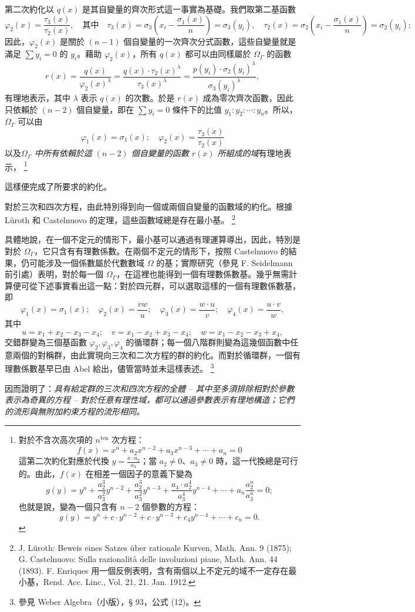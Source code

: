 \documentclass[11pt]{article}
\providecommand{\srcfn}[2]{%
  \begingroup
  \renewcommand{\thefootnote}{#1}%
  \footnote{#2}%
  \addtocounter{footnote}{-1}%
  \endgroup}
\begin{document}
第二次約化以 $q(x)$ 是其自變量的齊次形式這一事實為基礎。我們取第二基函數
\[
\varphi_2(x)=\frac{\tau_3(x)}{\tau_2(x)},\quad \text{其中}\quad
\tau_3(x)=\sigma_3\left(x_i-\frac{\sigma_1(x)}{n}\right)=\sigma_3(y_i),\quad
\tau_2(x)=\sigma_2\left(x_i-\frac{\sigma_1(x)}{n}\right)=\sigma_2(y_i);
\]
因此，$\varphi_2(x)$ 是關於 $(n-1)$ 個自變量的一次齊次分式函數，這些自變量就是滿足 $\sum y_i=0$ 的 $y_i$。藉助 $\varphi_2(x)$，所有 $q(x)$ 都可以由同樣屬於 $\Omega_\Gamma$ 的函數
\[
r(x)=\frac{q(x)}{\varphi_2(x)^\lambda}=\frac{q(x)\cdot\tau_2(x)^\lambda}{\tau_3(x)^\lambda}=\frac{p(y_i)\cdot\sigma_2(y_i)^\lambda}{\sigma_3(y_i)^\lambda},
\]
有理地表示，其中 $\lambda$ 表示 $q(x)$ 的次數。於是 $r(x)$ 成為零次齊次函數，因此只依賴於 $(n-2)$ 個自變量，即在 $\sum y_i=0$ 條件下的比值 $y_1:y_2:\cdots:y_n$。所以，$\Omega_\Gamma$ 可以由
\[
\varphi_1(x)=\sigma_1(x);\quad \varphi_2(x)=\frac{\tau_3(x)}{\tau_2(x)}
\]
以及\emph{$\Omega_\Gamma$ 中所有依賴於這 $(n-2)$ 個自變量的函數 $r(x)$ 所組成的域}有理地表示，\srcfn{*)}{對於不含次高次項的 $n^{\text{ten}}$ 次方程：
\[
f(x)=x^n+a_2x^{n-2}+a_3x^{n-3}+\cdots+a_n=0
\]
這第二次約化對應於代換 $y=\frac{x\cdot a_2}{a_3}$；當 $a_2\neq0$、$a_3\neq0$ 時，這一代換總是可行的。由此，$f(x)$ 在相差一個因子的意義下變為
\[
g(y)=y^n+\frac{a_2^3}{a_3^2}y^{n-2}+\frac{a_2^3}{a_3^2}y^{n-3}+\frac{a_4\cdot a_2^4}{a_3^4}y^{n-4}+\cdots+a_n\frac{a_2^n}{a_3^n}=0;
\]
也就是說，變為一個只含有 $n-2$ 個參數的方程：
\[
g(y)=y^n+c\cdot y^{n-2}+c\cdot y^{n-3}+c_4y^{n-4}+\cdots+c_n=0.
\]} 這樣便完成了所要求的約化。

對於三次和四次方程，由此特別得到向一個或兩個自變量的函數域的約化。根據 Lüroth 和 Castelnuovo 的定理，這些函數域總是存在最小基。\srcfn{**)}{J. Lüroth: Beweis eines Satzes über rationale Kurven, Math. Ann. 9 (1875); G. Castelnuovo: Sulla razionalità delle involuzioni piane, Math. Ann. 44 (1893). F. Enriques 用一個反例表明，含有兩個以上不定元的域不一定存在最小基，Rend. Acc. Linc., Vol. 21, 21. Jan. 1912.} 具體地說，在一個不定元的情形下，最小基可以通過有理運算導出，因此，特別是對於 $\Omega_\Gamma$，它只含有有理數係數。在兩個不定元的情形下，按照 Castelnuovo 的結果，仍可能涉及一個係數屬於代數數域 $\Omega$ 的基；實際研究（參見 F. Seidelmann 前引處）表明，對於每一個 $\Omega_\Gamma$，在這裡也能得到一個有理數係數基。幾乎無需計算便可從下述事實看出這一點：對於四元群，可以選取這樣的一個有理數係數基，即
\[
\varphi_1(x)=\sigma_1(x);\quad \varphi_2(x)=\frac{v w}{u};\quad \varphi_3(x)=\frac{w\cdot u}{v};\quad \varphi_4(x)=\frac{u\cdot v}{w},
\]
其中
\[
u=x_1+x_2-x_3-x_4;\quad v=x_1-x_2+x_3-x_4;\quad w=x_1-x_2-x_3+x_4,
\]
交錯群變為三個基函數 $\varphi_2,\varphi_3,\varphi_4$ 的循環群；每一個八階群則變為這幾個函數中任意兩個的對稱群，由此實現向三次和二次方程的群的約化。而對於循環群，一個有理數係數基早已由 Abel 給出，儘管當時並未這樣表述。\srcfn{*)}{參見 Weber Algebra（小版），§ 93，公式 (12)。} 因而證明了：\emph{具有給定群的三次和四次方程的全體 -- 其中至多須排除相對於參數表示為奇異的方程 -- 對於任意有理性域，都可以通過參數表示有理地構造；它們的流形與無附加約束方程的流形相同。}
\end{document}
